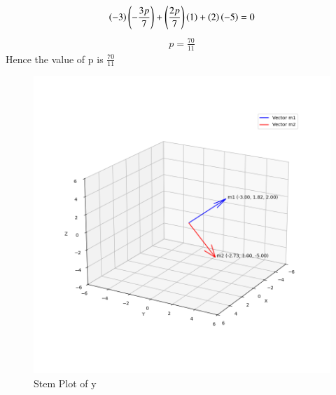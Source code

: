 \documentclass[journal]{IEEEtran}
\begin{document}
\begin{align}
\brak{-3}\brak{-\frac{3p}{7}} + \brak{\frac{2p}{7}}\brak{1} + \brak{2}\brak{-5} = 0
\end{align}
\begin{align}
p = \frac{70}{11}
\end{align}
 Hence the value of p is $\frac{70}{11}$
\begin{figure}[h!]
   \centering
   \includegraphics[width=0.7\columnwidth]{figs/fig1.png}
   \caption{Stem Plot of y}
   \label{stemplot}
\end{figure}
\end{document}
